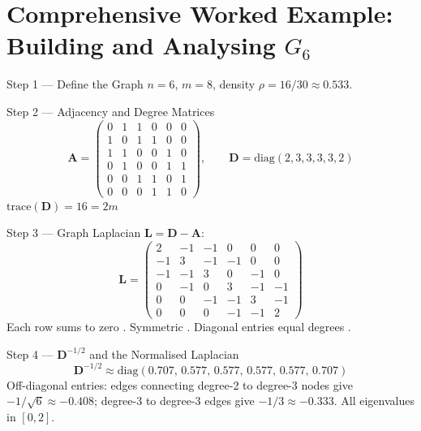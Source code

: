 \section{Comprehensive Worked Example: Building and Analysing $G_6$}
\label{sec:worked_example}

\begin{examplebox}{Step 1 --- Define the Graph}
$n=6$, $m=8$, density $\rho = 16/30 \approx 0.533$.
\end{examplebox}

\begin{examplebox}{Step 2 --- Adjacency and Degree Matrices}
\[
\mathbf{A} = \begin{pmatrix}
0&1&1&0&0&0\\1&0&1&1&0&0\\1&1&0&0&1&0\\0&1&0&0&1&1\\0&0&1&1&0&1\\0&0&0&1&1&0
\end{pmatrix}, \qquad
\mathbf{D} = \mathrm{diag}(2,3,3,3,3,2)
\]
$\mathrm{trace}(\mathbf{D}) = 16 = 2m$ \checkmark
\end{examplebox}

\begin{examplebox}{Step 3 --- Graph Laplacian}
$\mathbf{L} = \mathbf{D} - \mathbf{A}$:
\[
\mathbf{L} = \begin{pmatrix}
 2&-1&-1& 0& 0& 0\\
-1& 3&-1&-1& 0& 0\\
-1&-1& 3& 0&-1& 0\\
 0&-1& 0& 3&-1&-1\\
 0& 0&-1&-1& 3&-1\\
 0& 0& 0&-1&-1& 2
\end{pmatrix}
\]
Each row sums to zero \checkmark. Symmetric \checkmark. Diagonal entries equal degrees \checkmark.
\end{examplebox}

\begin{examplebox}{Step 4 --- $\mathbf{D}^{-1/2}$ and the Normalised Laplacian}
\[
\mathbf{D}^{-1/2} \approx \mathrm{diag}(0.707,\, 0.577,\, 0.577,\, 0.577,\, 0.577,\, 0.707)
\]
Off-diagonal entries: edges connecting degree-2 to degree-3 nodes give $-1/\sqrt{6} \approx -0.408$; degree-3 to degree-3 edges give $-1/3 \approx -0.333$. All eigenvalues in $[0,2]$.
\end{examplebox}


